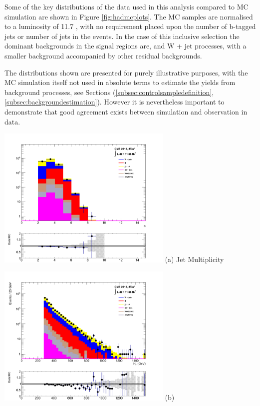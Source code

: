 Some of the key distributions of the data used in this analysis compared to MC simulation are shown in Figure \ref{fig:hadmcplots}. The MC samples are normalised to a luminosity of 11.7 \fb,  with no requirement placed upon the number of b-tagged jets or number of jets in the events. In the case of this inclusive selection the dominant backgrounds in the signal regions are, \zinv and W + jet processes, with a smaller \ttbar background accompanied by other residual backgrounds. 

The distributions shown are presented for purely illustrative purposes, with the MC simulation itself not used in absolute terms to estimate the yields from background processes, see Sections (\ref{subsec:controlsampledefinition}, \ref{subsec:backgroundestimation}). However it is nevertheless important to demonstrate that good agreement exists between simulation and observation in data.

\begin{minipage}{\linewidth}
\centering
\begin{minipage}{.48\textwidth}
\centering
\includegraphics[width = 3.3in]{plots/had_njet_datamc.pdf}
(a) Jet Multiplicity
\end{minipage}
\begin{minipage}{.48\textwidth}
\centering
\includegraphics[width = 3.3in]{plots/had_ht_datamc.pdf}
(b) \theht
\end{minipage}
\end{minipage}

